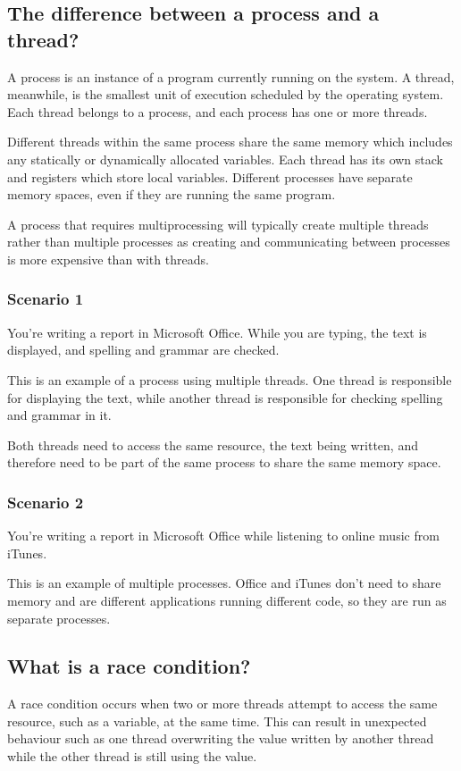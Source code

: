 \documentclass{article}
\begin{document}
\subsection{The difference between a process and a thread?}
A process is an instance of a program currently running on the system.
A thread, meanwhile, is the smallest unit of execution scheduled by the operating system.
Each thread belongs to a process, and each process has one or more threads.

Different threads within the same process share the same memory which includes any
statically or dynamically allocated variables. Each thread has its own stack and registers
which store local variables.
Different processes have separate memory spaces, even if they are running the same program.

A process that requires multiprocessing will typically create multiple threads
rather than multiple processes as creating and communicating between processes is
more expensive than with threads.

    \subsubsection{Scenario 1}
    You're writing a report in Microsoft Office. While you are typing, the text is
    displayed, and spelling and grammar are checked.

    This is an example of a process using multiple threads.
    One thread is responsible for displaying the text, while another thread is responsible
    for checking spelling and grammar in it.

    Both threads need to access the same resource, the text being written, and therefore
    need to be part of the same process to share the same memory space.

    \subsubsection{Scenario 2}
    You're writing a report in Microsoft Office while listening to online music from
    iTunes.

    This is an example of multiple processes. Office and iTunes don't need to share
    memory and are different applications running different code, so they are run as
    separate processes.


\subsection{What is a race condition?}
A race condition occurs when two or more threads attempt to access the same resource,
such as a variable, at the same time. This can result in unexpected behaviour such as
one thread overwriting the value written by another thread while the other thread is
still using the value.
\end{document}
